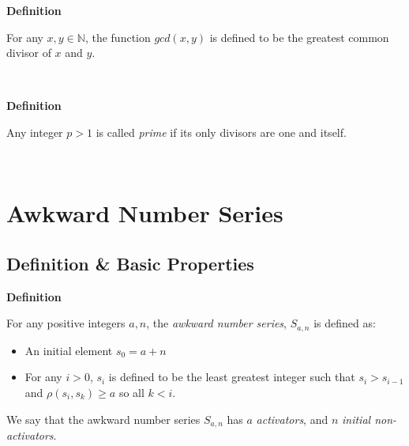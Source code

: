\documentclass[a4paper,12pt]{article}
\begin{document}
\label{definition:gcd}
\hypertarget{definition:gcd}{}
\begin{tcolorbox}
\textbf{Definition}

\noindent For any $x, y \in \mathbb{N}$, the function $gcd(x, y)$ is defined to be the greatest common divisor of $x$ and $y$.
\end{tcolorbox}
\noindent \\








\label{definition:prime_numbers}
\hypertarget{definition:prime_numbers}{}
\begin{tcolorbox}
\textbf{Definition}

\noindent Any integer $p > 1$ is called \textit{prime} if its only divisors are one and itself.

\end{tcolorbox}
\noindent \\









\section{Awkward Number Series}
\label{section:awkward_number_series}


\subsection{Definition \& Basic Properties}

\label{definition:awkward_number_series}
\hypertarget{definition:awkward_number_series}{}
\begin{tcolorbox}
\textbf{Definition}

\noindent For any positive integers $a, n$, the \textit{awkward number series}, $S_{a, n}$ is defined as:

\begin{itemize}
\item An initial element $s_0 = a + n$
\item For any $i > 0$, $s_i$ is defined to be the least greatest integer such that $s_i > s_{i - 1}$ and $\rho(s_i, s_k) \geq a$ so all $k < i$.
\end{itemize}


\noindent We say that the awkward number series $S_{a,n}$ has $a$ \textit{activators}, and $n$ \textit{initial non-activators}.

\end{tcolorbox}
\noindent \\
\end{document}
